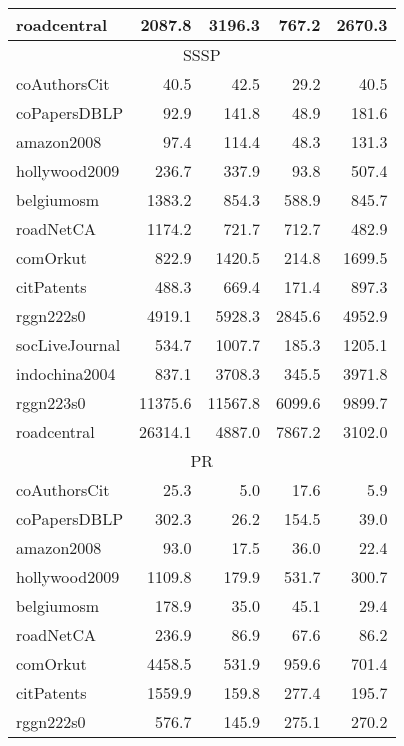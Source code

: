 \begin{table}[tbp]
\begin{center}
\begin{tabular}{|l|r|r|r|r|}
        \rowcolor{black!10} roadcentral&2087.8&3196.3&767.2&2670.3\\
        \hline
        \hline
        \multicolumn{5}{|c|}{SSSP} \\
        \hline
        \rowcolor{black!10} coAuthorsCit&40.5&42.5&29.2&40.5\\
        \rowcolor{black!2 } coPapersDBLP&92.9&141.8&48.9&181.6\\
        \rowcolor{black!10} amazon2008&97.4&114.4&48.3&131.3\\
        \rowcolor{black!2 } hollywood2009&236.7&337.9&93.8&507.4\\
        \rowcolor{black!10} belgiumosm&1383.2&854.3&588.9&845.7\\
        \rowcolor{black!2 } roadNetCA&1174.2&721.7&712.7&482.9\\
        \rowcolor{black!10} comOrkut&822.9&1420.5&214.8&1699.5\\
        \rowcolor{black!2 } citPatents&488.3&669.4&171.4&897.3\\
        \rowcolor{black!10} rggn222s0&4919.1&5928.3&2845.6&4952.9\\
        \rowcolor{black!2 } socLiveJournal&534.7&1007.7&185.3&1205.1\\
        \rowcolor{black!10} indochina2004&837.1&3708.3&345.5&3971.8\\
        \rowcolor{black!2 } rggn223s0&11375.6&11567.8&6099.6&9899.7\\
        \rowcolor{black!10} roadcentral&26314.1&4887.0&7867.2&3102.0\\
        \hline
        \hline
        \multicolumn{5}{|c|}{PR} \\
        \hline
        \rowcolor{black!10} coAuthorsCit&25.3&5.0&17.6&5.9\\
        \rowcolor{black!2 } coPapersDBLP&302.3&26.2&154.5&39.0\\
        \rowcolor{black!10} amazon2008&93.0&17.5&36.0&22.4\\
        \rowcolor{black!2 } hollywood2009&1109.8&179.9&531.7&300.7\\
        \rowcolor{black!10} belgiumosm&178.9&35.0&45.1&29.4\\
        \rowcolor{black!2 } roadNetCA&236.9&86.9&67.6&86.2\\
        \rowcolor{black!10} comOrkut&4458.5&531.9&959.6&701.4\\
        \rowcolor{black!2 } citPatents&1559.9&159.8&277.4&195.7\\
        \rowcolor{black!10} rggn222s0&576.7&145.9&275.1&270.2\\

\end{tabular}
\end{center}
\end{table}
